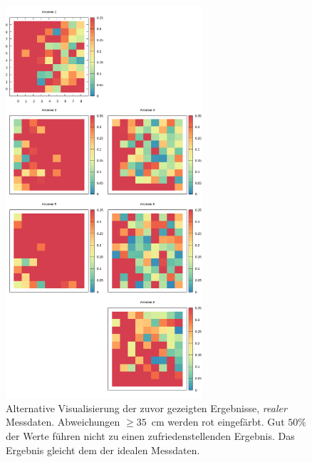 \begin{figure}[!ht]
	\centering
	\caption[Limitierte Ergebnisse - Reale Messwerte]{Alternative Visualisierung der zuvor gezeigten Ergebnisse, \textit{realer} Messdaten.  Abweichungen $\ge35$~cm werden rot eingefärbt. Gut $50\%$ der Werte führen nicht zu einen zufriedenstellenden Ergebnis. Das Ergebnis gleicht dem der idealen Messdaten. }
	\label{fig:results5}
	\vspace{3mm}
	\includegraphics[width=0.65\textwidth]{img/limitedReal.png}
\end{figure}
%
